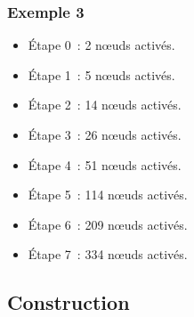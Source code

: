 \documentclass[12pt, handout]{beamer}
\begin{document}
\begin{frame}
\frametitle{Exemple 3}

\begin{itemize}
 \item Étape 0~: 2  n\oe{}uds activés.
 \item Étape 1~: 5  n\oe{}uds activés.
 \item Étape 2~: 14 n\oe{}uds activés.
 \item Étape 3~: 26 n\oe{}uds activés.
 \item Étape 4~: 51 n\oe{}uds activés.
 \item Étape 5~: 114 n\oe{}uds activés.
 \item Étape 6~: 209 n\oe{}uds activés.
 \item Étape 7~: 334 n\oe{}uds activés.
\end{itemize}


\end{frame}

%  
% 
%  



\subsection{Construction}
\end{document}
